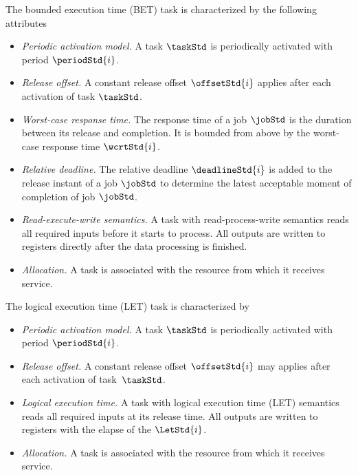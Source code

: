 \begin{definition}
The bounded execution time (BET) task is characterized by the following attributes
	\begin{itemize}[leftmargin=*,itemsep=0pt]
	\item \emph{Periodic activation model.} A task $\taskStd$ is periodically activated with period $\periodStd{i}$.
	\item \emph{Release offset.} A constant release offset $\offsetStd{i}$ applies after each activation of task $\taskStd$.	
	\item \emph{Worst-case response time.} The response time of a job $\jobStd$ is the duration between its release and completion. 
	It is bounded from above by the worst-case response time $\wcrtStd{i}$.
	\item \emph{Relative deadline.} The relative deadline $\deadlineStd{i}$ is added to the release instant of a job $\jobStd$ to determine the latest acceptable moment of completion of job $\jobStd$.
	\item \emph{Read-execute-write semantics.} A task with read-process-write semantics reads all required inputs before it starts to process. All outputs are written to registers directly after the data processing is finished. 
	\item \emph{Allocation.} A task is associated with the resource from which it receives service.	
\end{itemize}
\end{definition}

\newpage
\begin{definition}
The logical execution time (LET) task is characterized by
\begin{itemize}[leftmargin=*,itemsep=0pt]
	\item \emph{Periodic activation model.} A task $\taskStd$ is periodically activated with period $\periodStd{i}$.
	\item \emph{Release offset.} A constant release offset $\offsetStd{i}$ may applies after each activation of task~$\taskStd$.	
		\item \emph{Logical execution time.} A task with logical execution time (LET) semantics reads all required inputs at its release time.  All outputs are written to registers with the elapse of the $\LetStd{i}$. 
	\item \emph{Allocation.} A task is associated with the resource from which it receives service.		
\end{itemize}
\end{definition}
%
\bigskip

